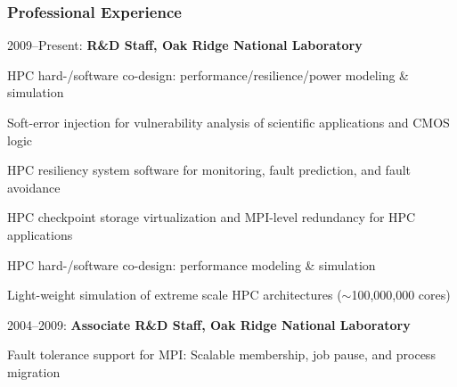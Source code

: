 \vspace*{-2ex}
\subsubsection*{Professional Experience}
\vspace*{-1ex}

\begin{compactitem}[0000--Present :]
  \item[2009--Present\hfill :] \textbf{R\&D Staff,
                                       Oak Ridge National Laboratory }
                            \begin{compactitem}
                            \item HPC hard-/software co-design:
                                  performance/resilience/power modeling \&
                                  simulation
                            \item Soft-error injection for vulnerability
                                  analysis of scientific applications and
                                  CMOS logic
                            \item HPC resiliency system software for monitoring,
                                  fault prediction, and fault avoidance
                            \item HPC checkpoint storage virtualization and
                                  MPI-level redundancy for HPC applications
                            \item HPC hard-/software co-design:
                                  performance modeling \& simulation
                            \item Light-weight simulation of extreme scale HPC
                                  architectures ($\sim$100,000,000 cores)
                            \end{compactitem}
  \item[2004--2009\hfill :] \textbf{Associate R\&D Staff,
                                    Oak Ridge National Laboratory }
                            \begin{compactitem}
                            \item Fault tolerance support for MPI: Scalable
                                  membership, job pause, and process migration

\end{compactitem}
\end{compactitem}
